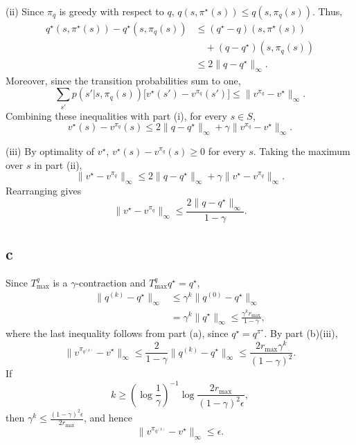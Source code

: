 \documentclass{article}
\begin{document}
\noindent (ii) Since $\pi_q$ is greedy with respect to $q$,
$q(s,\pi^\star(s))\leq q(s,\pi_q(s))$. Thus,
\[
\begin{aligned}
q^\star(s,\pi^\star(s))-q^\star(s,\pi_q(s))
&\leq (q^\star-q)(s,\pi^\star(s))\\
&\quad +(q-q^\star)(s,\pi_q(s))\\
&\leq 2\|q-q^\star\|_\infty.
\end{aligned}
\]
Moreover, since the transition probabilities sum to one,
\[
\sum_{s'}p(s'|s,\pi_q(s))
\bigl[v^\star(s')-v^{\pi_q}(s')\bigr]
\leq \|v^{\pi_q}-v^\star\|_\infty.
\]
Combining these inequalities with part (i), for every $s\in S$,
\[
v^\star(s)-v^{\pi_q}(s)
\leq 2\|q-q^\star\|_\infty+\gamma\|v^{\pi_q}-v^\star\|_\infty.
\]

\noindent (iii) By optimality of $v^\star$, $v^\star(s)-v^{\pi_q}(s)\geq 0$ for every $s$.
Taking the maximum over $s$ in part (ii),
\[
\|v^\star-v^{\pi_q}\|_\infty
\leq 2\|q-q^\star\|_\infty+\gamma\|v^\star-v^{\pi_q}\|_\infty.
\]
Rearranging gives
\[
\|v^\star-v^{\pi_q}\|_\infty
\leq \frac{2\|q-q^\star\|_\infty}{1-\gamma}.
\]

\subsection*{c}
Since $T_{\max}^q$ is a $\gamma$-contraction and $T_{\max}^q q^\star=q^\star$,
\[
\begin{aligned}
\|q^{(k)}-q^\star\|_\infty
&\leq \gamma^k\|q^{(0)}-q^\star\|_\infty\\
&=\gamma^k\|q^\star\|_\infty
\leq \frac{\gamma^k r_{\max}}{1-\gamma},
\end{aligned}
\]
where the last inequality follows from part (a), since $q^\star=q^{\pi^\star}$. By part (b)(iii),
\[
\|v^{\pi_{q^{(k)}}}-v^\star\|_\infty
\leq \frac{2}{1-\gamma}\|q^{(k)}-q^\star\|_\infty
\leq \frac{2r_{\max}\gamma^k}{(1-\gamma)^2}.
\]
If
\[
k\geq \left(\log\frac{1}{\gamma}\right)^{-1}
\log\frac{2r_{\max}}{(1-\gamma)^2\epsilon},
\]
then $\gamma^k\leq \frac{(1-\gamma)^2\epsilon}{2r_{\max}}$, and hence
\[
\|v^{\pi_{q^{(k)}}}-v^\star\|_\infty\leq\epsilon.
\]

\section{}
\end{document}
